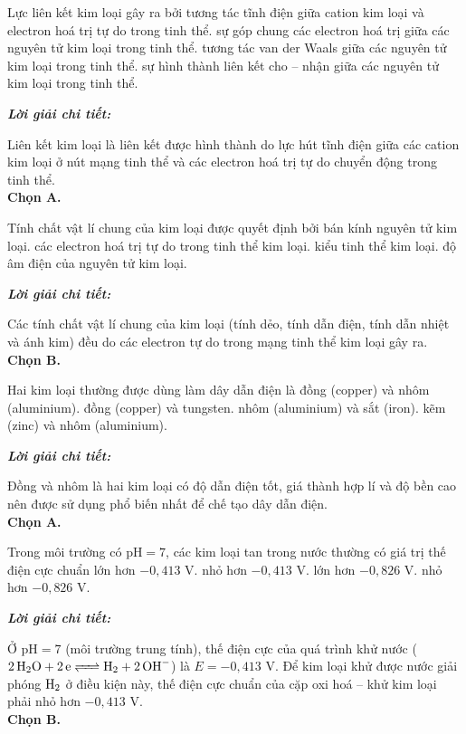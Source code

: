 \documentclass[11pt,a4paper]{article}
\def\loigiai#1{
\par\begingroup\color{blue!80!black}\small
\noindent\textbf{\textit{Lời giải chi tiết:}}\par
#1\par\endgroup}
\begin{document}
\begin{ex}
Lực liên kết kim loại gây ra bởi
\choice
{\True tương tác tĩnh điện giữa cation kim loại và electron hoá trị tự do trong tinh thể.}
{sự góp chung các electron hoá trị giữa các nguyên tử kim loại trong tinh thể.}
{tương tác van der Waals giữa các nguyên tử kim loại trong tinh thể.}
{sự hình thành liên kết cho -- nhận giữa các nguyên tử kim loại trong tinh thể.}
\loigiai{
Liên kết kim loại là liên kết được hình thành do lực hút tĩnh điện giữa các cation kim loại ở nút mạng tinh thể và các electron hoá trị tự do chuyển động trong tinh thể.\\
\textbf{Chọn A.}}
\end{ex}

\begin{ex}
Tính chất vật lí chung của kim loại được quyết định bởi
\choice
{bán kính nguyên tử kim loại.}
{\True các electron hoá trị tự do trong tinh thể kim loại.}
{kiểu tinh thể kim loại.}
{độ âm điện của nguyên tử kim loại.}
\loigiai{
Các tính chất vật lí chung của kim loại (tính dẻo, tính dẫn điện, tính dẫn nhiệt và ánh kim) đều do các electron tự do trong mạng tinh thể kim loại gây ra.\\
\textbf{Chọn B.}}
\end{ex}

\begin{ex}
Hai kim loại thường được dùng làm dây dẫn điện là
\choice
{\True đồng (copper) và nhôm (aluminium).}
{đồng (copper) và tungsten.}
{nhôm (aluminium) và sắt (iron).}
{kẽm (zinc) và nhôm (aluminium).}
\loigiai{
Đồng và nhôm là hai kim loại có độ dẫn điện tốt, giá thành hợp lí và độ bền cao nên được sử dụng phổ biến nhất để chế tạo dây dẫn điện.\\
\textbf{Chọn A.}}
\end{ex}

\begin{ex}
Trong môi trường có $\text{pH} = 7$, các kim loại tan trong nước thường có giá trị thế điện cực chuẩn
\choice
{lớn hơn $-0{,}413\text{ V}$.}
{\True nhỏ hơn $-0{,}413\text{ V}$.}
{lớn hơn $-0{,}826\text{ V}$.}
{nhỏ hơn $-0{,}826\text{ V}$.}
\loigiai{
Ở $\text{pH} = 7$ (môi trường trung tính), thế điện cực của quá trình khử nước ($\ce{2H2O + 2e <=> H2 + 2OH-}$) là $E = -0{,}413\text{ V}$. Để kim loại khử được nước giải phóng $\ce{H2}$ ở điều kiện này, thế điện cực chuẩn của cặp oxi hoá -- khử kim loại phải nhỏ hơn $-0{,}413\text{ V}$.\\
\textbf{Chọn B.}}
\end{ex}
\end{document}
